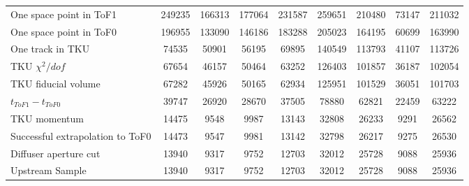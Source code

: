 \begin{landscape}
\begin{table}
\begin{tabular}[pos]{l|cccccccc}
\hline                                            
One space point in ToF1                            &  249235  &  166313  &  177064  &  231587  &  259651  &  210480  &   73147  &  211032  \\
One space point in ToF0                            &  196955  &  133090  &  146186  &  183288  &  205023  &  164195  &   60699  &  163990  \\
One track in TKU                                   &   74535  &   50901  &   56195  &   69895  &  140549  &  113793  &   41107  &  113726  \\
TKU $\chi^2/dof$                                   &   67654  &   46157  &   50464  &   63252  &  126403  &  101857  &   36187  &  102054  \\
TKU fiducial volume                                &   67282  &   45926  &   50165  &   62934  &  125951  &  101529  &   36051  &  101703  \\
\hline                                            
$t_{ToF1} - t_{ToF0}$                              &   39747  &   26920  &   28670  &   37505  &   78880  &   62821  &   22459  &   63222  \\
TKU momentum                                       &   14475  &    9548  &    9987  &   13143  &   32808  &   26233  &    9291  &   26562  \\
\hline                                            
Successful extrapolation to ToF0                   &   14473  &    9547  &    9981  &   13142  &   32798  &   26217  &    9275  &   26530  \\
Diffuser aperture cut                              &   13940  &    9317  &    9752  &   12703  &   32012  &   25728  &    9088  &   25936  \\
\hline                                            
Upstream Sample                                    &   13940  &    9317  &    9752  &   12703  &   32012  &   25728  &    9088  &   25936  \\
\hline                                            

\end{tabular}
\end{table}
\end{landscape}


